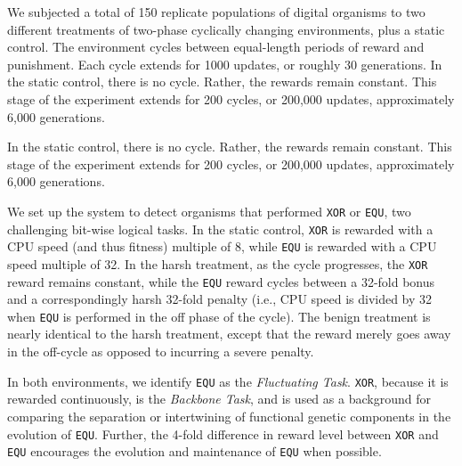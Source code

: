 \documentclass[10pt,letterpaper]{article}
\begin{document}
We subjected a total of 150 replicate populations of digital organisms to two different treatments of two-phase cyclically changing environments, plus a static control. The environment cycles between equal-length periods of reward and punishment. Each cycle extends for 1000 updates, or roughly 30 generations. In the static control, there is no cycle. Rather, the rewards remain constant. This stage of the experiment extends for 200 cycles, or 200,000 updates, approximately 6,000 generations.

In the static control, there is no cycle. Rather, the rewards remain constant. This stage of the experiment extends for 200 cycles, or 200,000 updates, approximately 6,000 generations.


We set up the system to detect organisms that performed \texttt{XOR} or \texttt{EQU}, two challenging bit-wise logical tasks. In the static control, \texttt{XOR} is rewarded with a CPU speed (and thus fitness) multiple of 8, while \texttt{EQU} is rewarded with a CPU speed multiple of 32. In the harsh treatment, as the cycle progresses, the \texttt{XOR} reward remains constant, while the \texttt{EQU} reward cycles between a 32-fold bonus and a correspondingly harsh 32-fold penalty (i.e., CPU speed is divided by 32 when \texttt{EQU} is performed in the off phase of the cycle). The benign treatment is nearly identical to the harsh treatment, except that the reward merely goes away in the off-cycle as opposed to incurring a severe penalty.

In both environments, we identify \texttt{EQU} as the \textit{Fluctuating Task}. \texttt{XOR}, because it is rewarded continuously, is the \textit{Backbone Task}, and is used as a background for comparing the separation or intertwining of functional genetic components in the evolution of \texttt{EQU}. Further, the 4-fold difference in reward level between \texttt{XOR} and \texttt{EQU} encourages the evolution and maintenance of \texttt{EQU} when possible.
\end{document}
